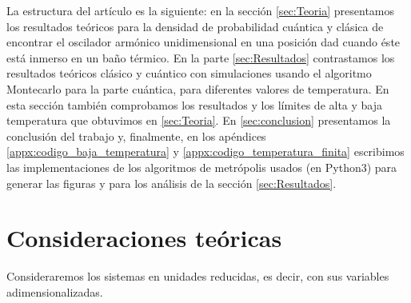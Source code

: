 \documentclass[%
 reprint,
 amsmath,amssymb,
 aps,
 pra,
]{revtex4-2}
\begin{document}
La estructura del artículo es la siguiente: en la sección \ref{sec:Teoria} presentamos los resultados teóricos para la densidad de probabilidad cuántica y clásica de encontrar el oscilador armónico unidimensional en una posición dad cuando éste está inmerso en un baño térmico. En la parte \ref{sec:Resultados} contrastamos los resultados teóricos clásico y cuántico con simulaciones usando el algoritmo Montecarlo para la parte cuántica, para diferentes valores de temperatura. En esta sección también comprobamos los resultados y los límites de alta y baja temperatura que obtuvimos en \ref{sec:Teoria}. En \ref{sec:conclusion} presentamos la conclusión del trabajo y, finalmente, en los apéndices \ref{appx:codigo_baja_temperatura} y \ref{appx:codigo_temperatura_finita} escribimos las implementaciones de los algoritmos de metrópolis usados (en Python3) para generar las figuras y para los análisis de la sección \ref{sec:Resultados}. 


\section{\label{sec:Teoria}Consideraciones teóricas}

Consideraremos los sistemas en unidades reducidas, es decir, con sus variables adimensionalizadas.
\end{document}
